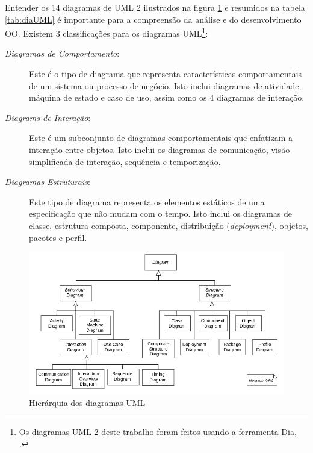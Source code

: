 Entender os 14 diagramas de UML 2 ilustrados na figura \ref{fig:uml14dia} e resumidos na tabela \ref{tab:diaUML} é importante para a compreensão da análise e do desenvolvimento OO. Existem 3 classificações para os diagramas UML\footnote{Os diagramas UML 2 deste trabalho foram feitos usando a ferramenta Dia, \cite{dia:tool}.}:

\begin{description}
\item[\emph{Diagramas de Comportamento}:] Este é o tipo de diagrama que representa características comportamentais de um sistema ou processo de negócio. Isto inclui diagramas de atividade, máquina de estado e caso de uso, assim como os 4 diagramas de interação.

\item[\emph{Diagrams de Interação}:] Este é um subconjunto de diagramas comportamentais que enfatizam a interação entre objetos. Isto inclui os diagramas de comunicação, visão simplificada de interação, sequência e temporização.

\item[\emph{Diagramas Estruturais}:] Este tipo de diagrama representa os elementos estáticos de uma especificação que não mudam com o tempo. Isto inclui os diagramas de classe, estrutura composta, componente, distribuição (\textit{deployment}), objetos, pacotes e perfil.
\end{description}

\begin{figure}[h]
\begin{center}
\includegraphics[scale=0.55]{UML_diagrams_overview.png} 
\caption{Hierárquia dos diagramas UML} \label{fig:uml14dia}
\end{center}
\end{figure}

